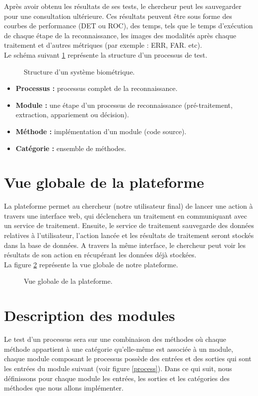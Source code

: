  Après avoir obtenu les résultats de ses tests, le chercheur peut les sauvegarder pour une consultation ultérieure. Ces résultats peuvent être sous forme des courbes de performance (DET ou ROC), des temps, tels que le temps d’exécution de chaque étape de la reconnaissance, les images des modalités après chaque traitement et d’autres métriques (par exemple : ERR, FAR. etc).\\
 Le schéma suivant \ref{archisysmultimodal} représente la structure d'un processus de test.
\begin{figure}[H]
	\centering
	\caption{Structure d’un système biométrique.}
	\label{archisysmultimodal}
\end{figure}
\begin{itemize}
	\item \textbf{Processus :} processus complet de la reconnaissance. 
	\item \textbf{Module :} une étape d’un processus de reconnaissance (pré-traitement, extraction, appariement ou décision).
	\item \textbf{Méthode :} implémentation d’un module (code source).
	\item \textbf{Catégorie :} ensemble de méthodes.
\end{itemize}

\section{Vue globale de la plateforme}
La plateforme permet au chercheur (notre utilisateur final) de lancer une action à travers une interface web, qui déclenchera un traitement en communiquant avec un service de traitement. Ensuite, le service de traitement sauvegarde des données relatives à l'utilisateur, l'action lancée et les résultats de traitement seront stockés dans la base de données. A travers la même interface, le chercheur peut voir les résultats de son action en récupérant les données déjà stockées. 
\\ La figure \ref{vuePlateforme} représente la vue globale de notre plateforme.

\begin{figure}[H]
	\centering
	\caption{Vue globale de la plateforme.}
	\label{vuePlateforme}
\end{figure}

\section{Description des modules}
Le test d'un processus sera sur une combinaison des méthodes où chaque méthode appartient à une catégorie qu'elle-même est associée à un module, chaque module composant le processus possède des entrées et des sorties qui sont les entrées du module suivant (voir figure \ref{process}). Dans ce qui suit, nous définissons pour chaque module les entrées, les sorties et les catégories des méthodes que nous allons implémenter.

